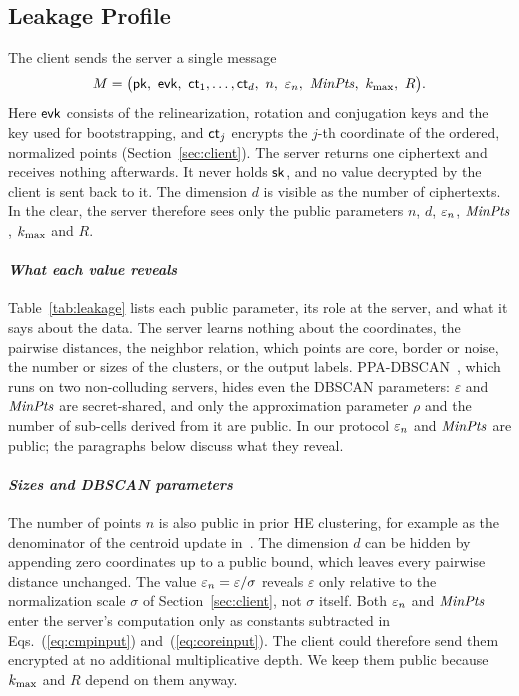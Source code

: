 \subsection{Leakage Profile}\label{sec:leakage}

The client sends the server a single message
\begin{equation}
  M = \bigl(\pk,\ \evk,\ \ct_1,\dots,\ct_d,\ n,\ \epsn,\ \MinPts,\ \kmax,\ R\bigr).
  \label{eq:message}
\end{equation}
Here $\mathsf{evk}$ consists of the relinearization, rotation and conjugation keys
and the key used for bootstrapping, and $\mathsf{ct}_j$ encrypts the $j$-th coordinate
of the ordered, normalized points (Section~\ref{sec:client}).
The server returns one ciphertext and receives nothing afterwards.
It never holds $\mathsf{sk}$, and no value decrypted by the client is sent back to it.
The dimension $d$ is visible as the number of ciphertexts.
In the clear, the server therefore sees only the public parameters $n$,
$d$, $\varepsilon_n$, $\mathit{MinPts}$, $k_{\max}$ and $R$.

\paragraph{\emph{What each value reveals}}
Table~\ref{tab:leakage} lists each public parameter, its role at the
server, and what it says about the data.
The server learns nothing about the coordinates, the pairwise distances, the
neighbor relation, which points are core, border or noise, the number or
sizes of the clusters, or the output labels.
PPA-DBSCAN~\cite{fu2024ppa}, which runs on two non-colluding servers,
hides even the DBSCAN parameters: $\varepsilon$ and $\mathit{MinPts}$ are
secret-shared, and only the approximation parameter $\rho$ and the number
of sub-cells derived from it are public.
In our protocol $\varepsilon_n$ and $\mathit{MinPts}$ are public; the paragraphs below
discuss what they reveal.


\paragraph{\emph{Sizes and DBSCAN parameters}}
The number of points $n$ is also public in prior HE clustering, for example
as the denominator of the centroid update in~\cite{yang2024optimized}.
The dimension $d$ can be hidden by appending zero coordinates up to a public
bound, which leaves every pairwise distance unchanged.
The value $\varepsilon_n = \varepsilon/\sigma$ reveals $\varepsilon$ only relative to
the normalization scale $\sigma$ of Section~\ref{sec:client}, not $\sigma$
itself.
Both $\varepsilon_n$ and $\mathit{MinPts}$ enter the server's computation only as constants
subtracted in Eqs.~(\ref{eq:cmpinput}) and~(\ref{eq:coreinput}).
The client could therefore send them encrypted at no additional
multiplicative depth.
We keep them public because $k_{\max}$ and $R$ depend on them anyway.

